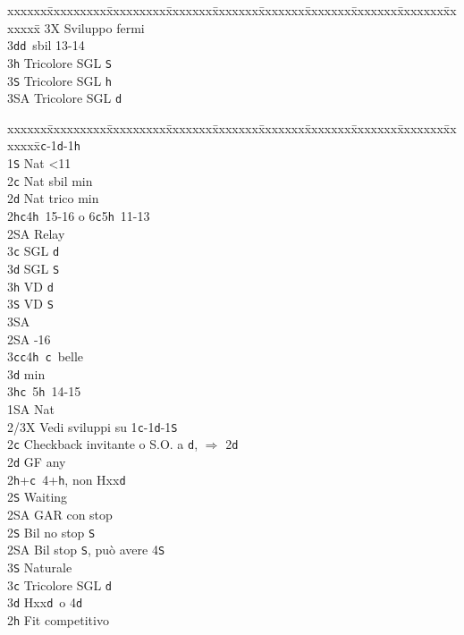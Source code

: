 \documentclass[a4paper,italian]{article}
\newcommand{\BS}{\small{\texttt{S}}}
\newcommand{\BC}{\small{\texttt{c}}}
\newcommand{\BD}{\small{\texttt{d}}}
\newcommand{\BH}{\small{\texttt{h}}}
\newenvironment{bidtable}
{\begin{tabbing}

    xxxxxx\=xxxxxxxxx\=xxxxxxxxx\=xxxxxxx\=xxxxxxx\=xxxxxxx\=xxxxxxx\=xxxxxxx\=xxxxxxx\=xxxxxxx\=\kill}
{\end{tabbing} }%
\begin{document}
\begin{multicols}{2}
\begin{bidtable}
        3X \> Sviluppo fermi\-\\
        3\BD {}\BD\ sbil 13-14\\
        3\BH \> Tricolore SGL \BS \\
        3\BS \> Tricolore SGL \BH \\
        3\small{SA} \> Tricolore SGL \BD \-
    \end{bidtable}
    \begin{bidtable}
        1\BC-1\BD-1\BH\+\\
        1\BS \> Nat <11\+\\
        2\BC \> Nat sbil min\\
        2\BD \> Nat trico min\\
        2\BH {}\BC 4\BH\ 15-16 o 6\BC 5\BH\ 11-13\+\\
        2\small{SA} \> Relay\+\\
        3\BC {} SGL \BD\\
        3\BD {} SGL \BS\\
        3\BH {} VD \BD\\
        3\BS {} VD \BS\\
        3\small{SA} \-\-\\
        2\small{SA} -16\\
        3\BC {}\BC 4\BH\ \BC\ belle\\
        3\BD {} min\\
        3\BH {}\BC\ 5\BH\ 14-15\-\\
        1\small{SA} \> Nat\+\\
        2/3X \> Vedi sviluppi su 1\BC -1\BD -1\BS \-\\
        2\BC \> Checkback invitante o S.O. a \BD , $\Rightarrow$ 2\BD \\
        2\BD \> GF any\+\\
        2\BH {}+\BC\ 4+\BH, non Hxx\BD\+\\
        2\BS\> Waiting\\
        2\small{SA} \> GAR con stop\-\\
        2\BS \> Bil no stop \BS \\
        2\small{SA} \> Bil stop \BS , può avere 4\BS \+\\
        3\BS \> Naturale\-\\
        3\BC \> Tricolore SGL \BD \\
        3\BD \> Hxx\BD\ o 4\BD\-\\
        [2pt]2\BH \> Fit competitivo\\

\end{bidtable}
\end{multicols}
\end{document}

